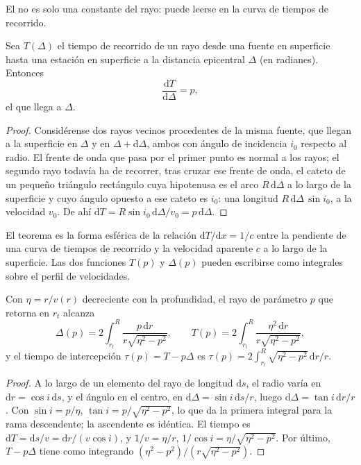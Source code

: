 El  no es solo una constante del rayo: puede leerse en la
curva de tiempos de recorrido.

\begin{theorem}\label{thm:b3:seismology-imaging:benndorf}
Sea $T(\Delta)$ el tiempo de recorrido de un rayo desde una fuente en superficie hasta una estación en superficie
a la distancia epicentral $\Delta$ (en radianes). Entonces
\[
  \frac{\mathrm dT}{\mathrm d\Delta} = p ,
\]
el  que llega a $\Delta$.
\end{theorem}

\begin{proof}
Considérense dos rayos vecinos procedentes de la misma fuente, que llegan a la superficie
en $\Delta$ y en $\Delta + \mathrm d\Delta$, ambos con ángulo de incidencia $i_0$
respecto al radio. El frente de onda que pasa por el primer punto es normal a los rayos;
el segundo rayo todavía ha de recorrer, tras cruzar ese frente de onda, el cateto
de un pequeño triángulo rectángulo cuya hipotenusa es el arco $R\,\mathrm d\Delta$ a lo largo
de la superficie y cuyo ángulo opuesto a ese cateto es $i_0$: una longitud
$R\,\mathrm d\Delta\,\sin i_0$, a la velocidad $v_0$. De ahí
$\mathrm dT = R\sin i_0\,\mathrm d\Delta/v_0 = p\,\mathrm d\Delta$.
\end{proof}

El teorema es la forma esférica de la relación $\mathrm dT/\mathrm dx = 1/c$
entre la pendiente de una curva de tiempos de recorrido y la velocidad aparente $c$ a lo largo de
la superficie. Las dos funciones $T(p)$ y $\Delta(p)$ pueden escribirse como integrales
sobre el perfil de velocidades.

\begin{proposition}\label{prop:b3:seismology-imaging:integrals}
Con $\eta = r/v(r)$ decreciente con la profundidad, el rayo de parámetro $p$ que retorna
en $r_t$ alcanza
\[
  \Delta(p) = 2\int_{r_t}^{R}\frac{p\,\mathrm dr}{r\sqrt{\eta^2 - p^2}},
  \qquad
  T(p) = 2\int_{r_t}^{R}\frac{\eta^2\,\mathrm dr}{r\sqrt{\eta^2 - p^2}},
\]
y el tiempo de intercepción $\tau(p) = T - p\Delta$ es
$\tau(p) = 2\int_{r_t}^{R}\sqrt{\eta^2 - p^2}\,\mathrm dr/r$.
\end{proposition}

\begin{proof}
A lo largo de un elemento del rayo de longitud $\mathrm ds$, el radio varía
en $\mathrm dr = \cos i\,\mathrm ds$, y el ángulo en el centro, en
$\mathrm d\Delta = \sin i\,\mathrm ds/r$, luego $\mathrm d\Delta = \tan i\,\mathrm dr/r$.
Con $\sin i = p/\eta$, $\tan i = p/\sqrt{\eta^2 - p^2}$, lo que da la primera
integral para la rama descendente; la ascendente es idéntica. El tiempo es
$\mathrm dT = \mathrm ds/v = \mathrm dr/(v\cos i)$, y $1/v = \eta/r$,
$1/\cos i = \eta/\sqrt{\eta^2 - p^2}$. Por último, $T - p\Delta$ tiene como integrando
$(\eta^2 - p^2)/(r\sqrt{\eta^2 - p^2})$.
\end{proof}


